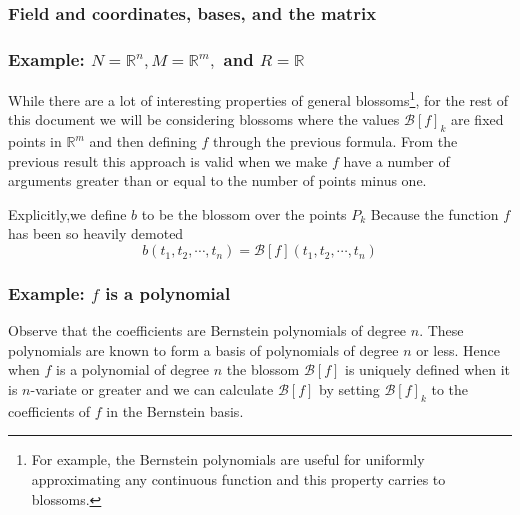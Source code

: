 % 

\subsubsection{Field and coordinates, bases, and the matrix}

\subsubsection{Example: $N=\mathbb{R}^n,M=\mathbb{R}^m,$ and $R=\mathbb{R}$}
While there are a lot of interesting properties of general blossoms\footnote{For example, the Bernstein polynomials are useful for uniformly approximating any continuous function and this property carries to blossoms.},
for the rest of this document we will be considering blossoms where the values $\mathcal{B}[f]_k$ are fixed points in $\mathbb{R}^m$ and then defining $f$ through the previous formula.
From the previous result this approach is valid when we make $f$ have a number of arguments greater than or equal to the number of points minus one.

Explicitly,we define $b$ to be the blossom over the points $P_k$
Because the function $f$ has been so heavily demoted 
\[b(t_1,t_2,\cdots,t_n) = \mathcal{B}[f](t_1,t_2,\cdots,t_n)\]

\subsubsection{Example: $f$ is a polynomial}
Observe that the coefficients are Bernstein polynomials of degree $n$.
These polynomials are known to form a basis of polynomials of degree $n$ or less.
Hence when $f$ is a polynomial of degree $n$ the blossom $\mathcal{B}[f]$ is uniquely defined when it is $n$-variate or greater and we can calculate $\mathcal{B}[f]$ by setting $\mathcal{B}[f]_k$ to the coefficients of $f$ in the Bernstein basis.


